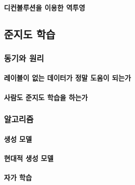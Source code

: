 \documentclass [12pt] {oblivoir}
\let\oldsubsubsection=\subsubsection
\renewcommand{\subsubsection}
{
  \filbreak
  \oldsubsubsection
}
\begin{document}
\vspace{3mm}

\paragraph*{디컨볼루션을 이용한 역투영}\mbox{}

\vspace{3mm}

\subsection{준지도 학습}

\subsubsection{동기와 원리}

\paragraph*{레이블이 없는 데이터가 정말 도움이 되는가}\mbox{}

\vspace{3mm}

\paragraph*{사람도 준지도 학습을 하는가}\mbox{}

\vspace{3mm}

\subsubsection{알고리즘}

\paragraph*{생성 모델}\mbox{}

\vspace{3mm}

\paragraph*{현대적 생성 모델}\mbox{}

\vspace{3mm}

\paragraph*{자가 학습}\mbox{}
\end{document}
